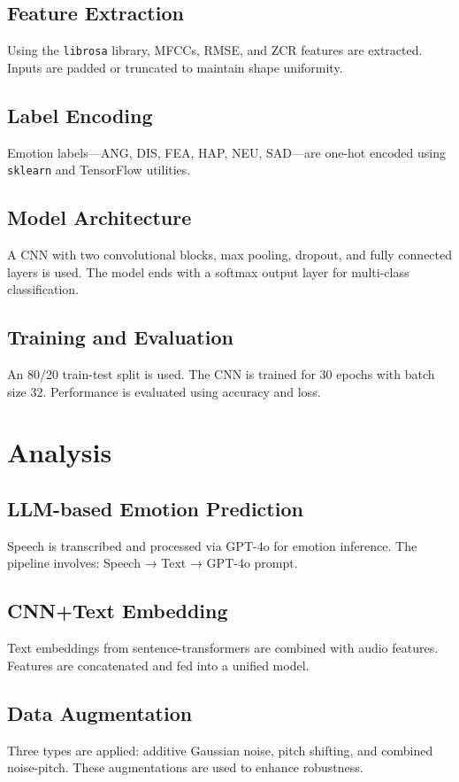 \documentclass[10pt,twocolumn,letterpaper]{article}
\begin{document}
\subsection{Feature Extraction}
Using the \texttt{librosa} library, MFCCs, RMSE, and ZCR features are extracted. Inputs are padded or truncated to maintain shape uniformity.

\subsection{Label Encoding}
Emotion labels—ANG, DIS, FEA, HAP, NEU, SAD—are one-hot encoded using \texttt{sklearn} and TensorFlow utilities.

\subsection{Model Architecture}
A CNN with two convolutional blocks, max pooling, dropout, and fully connected layers is used. The model ends with a softmax output layer for multi-class classification.

\subsection{Training and Evaluation}
An 80/20 train-test split is used. The CNN is trained for 30 epochs with batch size 32. Performance is evaluated using accuracy and loss.

\section{Analysis}
\subsection{LLM-based Emotion Prediction}
Speech is transcribed and processed via GPT-4o for emotion inference. The pipeline involves: Speech → Text → GPT-4o prompt.

\subsection{CNN+Text Embedding}
Text embeddings from sentence-transformers are combined with audio features. Features are concatenated and fed into a unified model.

\subsection{Data Augmentation}
Three types are applied: additive Gaussian noise, pitch shifting, and combined noise-pitch. These augmentations are used to enhance robustness.
\end{document}
